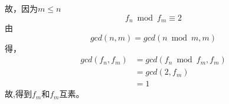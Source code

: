 \documentclass[]{article}
\begin{document}
故，因为$m \le n$
\begin{equation}
	f_{n} \bmod f_{m} \equiv 2
\end{equation}
由
\begin{equation}
	gcd(n,  m) =gcd (n \bmod m, m)
\end{equation}
得，
\begin{align}
	gcd(f_{n},f_{m}) &= gcd (f_{n} \bmod f_{m}, f_{m}) \\
	&=gcd (2,f_{m})\\
	&=1
\end{align}
故,得到$f_{m}$和$f_{m}$互素。
\end{document}

